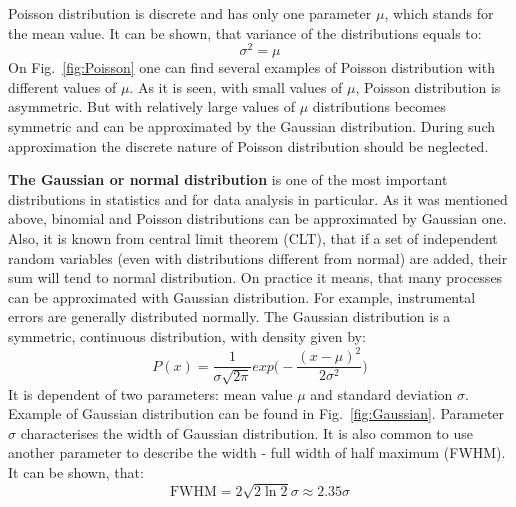 \documentclass[12pt,a4paper]{report}
\begin{document}
Poisson distribution is discrete and has only one parameter $\mu$, which stands for the mean value. It can be shown, that variance of the distributions equals to:
\begin{equation}
\sigma^2 = \mu 
\end{equation}
On Fig.~\ref{fig:Poisson} one can find several examples of Poisson distribution with different values of $\mu$. As it is seen, with small values of $\mu$, Poisson distribution is asymmetric. But with relatively large values of $\mu$ distributions becomes symmetric and can be approximated by the Gaussian distribution. During such approximation the discrete nature of Poisson distribution should be neglected.  \par 
\textbf{The Gaussian or normal distribution} is one of the most important distributions in statistics and for data analysis in particular. As it was mentioned above, binomial and Poisson distributions can be approximated by Gaussian one. Also, it is known from central limit theorem (CLT), that if a set of independent random variables (even with distributions different from normal) are added, their sum will tend to normal distribution. On practice it means, that many processes can be approximated with Gaussian distribution. For example, instrumental errors are generally distributed normally.
The Gaussian distribution is a symmetric, continuous distribution, with density given by:
\begin{equation} \label{gauss_dist}
P(x) = \frac{1}{\sigma \sqrt{2\pi}}exp\Big ( - \frac{(x-\mu)^2}{2\sigma^2} \Big )
\end{equation}
It is dependent of two parameters: mean value $\mu$ and standard deviation $\sigma$. Example of Gaussian distribution can be found in Fig.~\ref{fig:Gaussian}. Parameter $\sigma$ characterises the width of Gaussian distribution. It is also common to use another parameter to describe the width - full width of half maximum (FWHM). It can be shown, that:
\begin{equation} \label{FWHM}
\text{FWHM} = 2 \sqrt{2\ln 2}\sigma \approx 2.35 \sigma
\end{equation}
\end{document}
